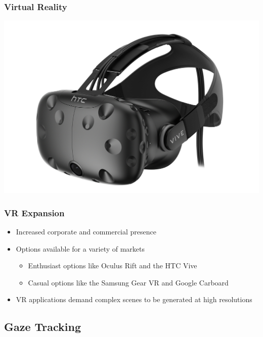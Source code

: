 \documentclass{beamer}
\newcommand{\linespace}{\vskip 0.25cm}
\begin{document}
\begin{frame}
  \frametitle{Virtual Reality}
  
  	\begin{center}
    		\includegraphics[width=.70\textwidth]{Illustrations/vive.png}
  	\end{center}
  
\end{frame}

\begin{frame}
  \frametitle{VR Expansion}
	\begin{itemize}
		\item Increased corporate and commercial presence
	\linespace
		\item Options available for a variety of markets
			\begin{itemize}
				\item Enthusiast options like Oculus Rift and the HTC Vive
				\item Casual options like the Samsung Gear VR and Google Carboard
			\end{itemize}
	\linespace 
		\item VR applications demand complex scenes to be generated at high resolutions			
	
	\end{itemize}
\end{frame}



\subsection{Gaze Tracking}
\end{document}
